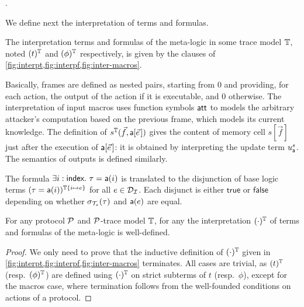 \newcommand{\interp}[1]{(#1)}

.

We define next the interpretation of terms and formulas. %

\begin{definition}
  The interpretation %
  terms and formulas of the meta-logic in
  some trace model $\mathbb{T}$, noted $\interp{t}^\TM$ and $\interp{\phi}^\TM$
  respectively, is given by the clauses of \cref{fig:interpt,fig:interpf,fig:inter-macros}.
\end{definition}

Basically, frames are defined as nested pairs, starting from $0$ and
providing, for each action, the output of the action if it is executable,
and $0$ otherwise. The interpretation of input macros uses function symbols $\mathsf{att}$ to models the arbitrary attacker's computation based on the previous frame, which models its current knowledge. The definition of $s^\TM(\vec{f},\sfa[\pvec{e}])$ gives the content of memory cell $s[\vec{f}]$ just after the execution of $\sfa[\pvec{e}]$:
it is obtained by interpreting the update term $u_{\textsf{a}}^{s}$. The semantics of outputs is defined similarly. 



\begin{example}
  The formula
  $\exists i:\textsf{index}.~ \tau = \textsf{a}(i)$
  is translated to the disjunction of base logic terms
  $\interp{\tau = \sfa(i)}^{\TM\{i\mapsto e\}}$ for all $e \in \mathcal{D}_{\mathcal{I}}$.
  Each disjunct is either $\mathsf{true}$ or $\mathsf{false}$ depending on
  whether $\sigma_{\mathcal{T}_s}(\tau)$ and $\textsf{a}(e)$ are equal.
\end{example}

\begin{proposition}
  For any protocol $\mathcal{P}$ and $\mathcal{P}$-trace model $\mathbb{T}$, for any the interpretation $(\cdot)^{\mathbb{T}}$ of terms and formulas of the meta-logic is well-defined.
\end{proposition}

\begin{proof}
  We only need to prove that the inductive definition of $(\cdot)^{\mathbb{T}}$ given in \cref{fig:interpt,fig:interpf,fig:inter-macros} terminates. All cases are trivial, as $(t)^{\mathbb{T}}$ (resp.\ $(\phi)^{\mathbb{T}}$) are defined using $(\cdot)^{\mathbb{T}}$ on strict subterms of $t$ (resp.\ $\phi$), except for the macros case, where termination follows from the well-founded conditions on actions of a protocol.
\end{proof}

